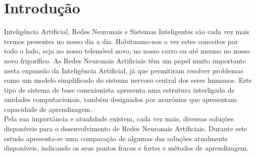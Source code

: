 \section*{Introdução}\label{sec:Introduction}

Inteligência Artificial, Redes Neuronais e Sistemas Inteligentes são cada vez mais termos presentes no nosso dia a dia. Habituamo-nos a ver estes conceitos por todo o lado, seja no nosso telemóvel novo, no nosso carro ou até mesmo no nosso novo frigorífico. As Redes Neuronais Artificiais têm um papel muito importante nesta expansão da Inteligência Artificial, já que permitiram resolver problemas como um modelo simplificado do sistema nervoso central dos seres humanos. Este tipo de sistema de base conexionista apresenta uma estrutura interligada de unidades computacionais, também designados por neurónios que apresentam capacidade de aprendizagem.
\\Pela sua importância e atualidade existem, cada vez mais, diversas soluções disponíveis para o desenvolvimento de Redes Neuronais Artificiais. Durante este estudo apresenta-se uma comparação de algumas das soluções atualmente disponíveis, indicando os seus pontos fracos e fortes e métodos de aprendizagem.